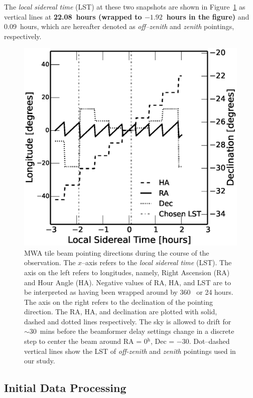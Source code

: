 \documentclass[preprint2,iop,numberedappendix]{emulateapj}
\begin{document}
The {\it local sidereal time} (LST) at these two snapshots are shown in Figure~\ref{fig:pointings} as vertical lines at {\bf 22.08~hours (wrapped to $-1.92$~hours in the figure)} and 0.09~hours, which are hereafter denoted as {\it off--zenith} and {\it zenith} pointings, respectively. 

\begin{figure}[htb]
\centering
\includegraphics[width=\linewidth]{fig2.eps}
\caption{MWA tile beam pointing directions during the course of the observation. The $x$--axis refers to the {\it local sidereal time} (LST). The axis on the left refers to longitudes, namely, Right Ascension (RA) and Hour Angle (HA). Negative values of RA, HA, and LST are to be interpreted as having been wrapped around by 360\arcdeg~ or 24 hours. The axis on the right refers to the declination of the pointing direction. The RA, HA, and declination are plotted with solid, dashed and dotted lines respectively. The sky is allowed to drift for $\sim 30$~mins before the beamformer delay settings change in a discrete step to center the beam around RA = 0$^\textrm{h}$, Dec = $-30$\arcdeg. Dot--dashed vertical lines show the LST of {\it off-zenith} and {\it zenith} pointings used in our study. \label{fig:pointings}}
\end{figure}

\subsection{Initial Data Processing}\label{sec:data-analysis}
\end{document}
